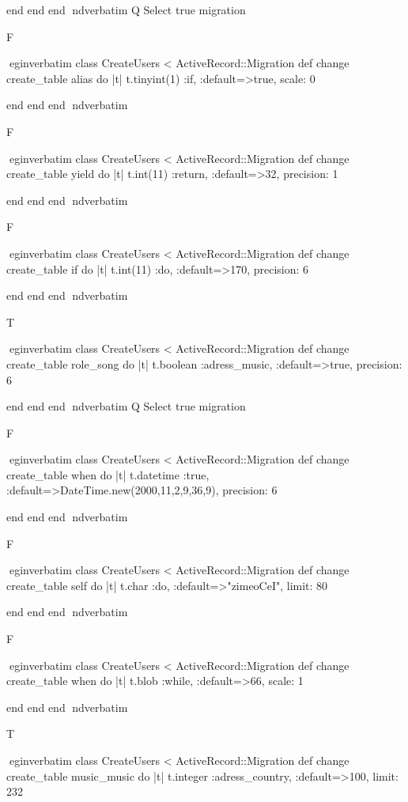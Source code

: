     end 
  end 
end
nd{verbatim}
Q
 Select true migration

F

egin{verbatim}
 class CreateUsers < ActiveRecord::Migration 
  def change 
    create_table alias do |t| 
      t.tinyint(1) :if, :default=>true, scale: 0
    
    end 
  end 
end
nd{verbatim}

F

egin{verbatim}
 class CreateUsers < ActiveRecord::Migration 
  def change 
    create_table yield do |t| 
      t.int(11) :return, :default=>32, precision: 1
    
    end 
  end 
end
nd{verbatim}

F

egin{verbatim}
 class CreateUsers < ActiveRecord::Migration 
  def change 
    create_table if do |t| 
      t.int(11) :do, :default=>170, precision: 6
    
    end 
  end 
end
nd{verbatim}

T

egin{verbatim}
 class CreateUsers < ActiveRecord::Migration 
  def change 
    create_table role_song do |t| 
      t.boolean :adress_music, :default=>true, precision: 6
    
    end 
  end 
end
nd{verbatim}
Q
 Select true migration

F

egin{verbatim}
 class CreateUsers < ActiveRecord::Migration 
  def change 
    create_table when do |t| 
      t.datetime :true, :default=>DateTime.new(2000,11,2,9,36,9), precision: 6
    
    end 
  end 
end
nd{verbatim}

F

egin{verbatim}
 class CreateUsers < ActiveRecord::Migration 
  def change 
    create_table self do |t| 
      t.char :do, :default=>"zimeoCeI", limit: 80
    
    end 
  end 
end
nd{verbatim}

F

egin{verbatim}
 class CreateUsers < ActiveRecord::Migration 
  def change 
    create_table when do |t| 
      t.blob :while, :default=>66, scale: 1
    
    end 
  end 
end
nd{verbatim}

T

egin{verbatim}
 class CreateUsers < ActiveRecord::Migration 
  def change 
    create_table music_music do |t| 
      t.integer :adress_country, :default=>100, limit: 232
    
